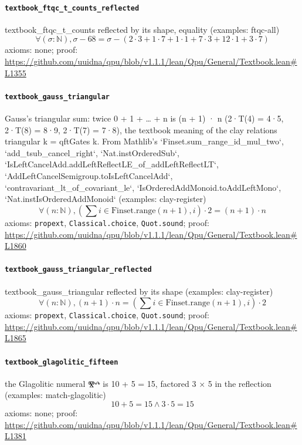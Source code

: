 \documentclass[11pt]{article}
\begin{document}
\paragraph{\texttt{textbook\_ftqc\_t\_counts\_reflected}}
textbook\_ftqc\_t\_counts reflected by its shape, equality (examples: ftqc-all)
\[ \forall (\sigma : \mathbb{N}), \sigma - 68 = \sigma - (2 \cdot 3 + 1 \cdot 7 + 1 \cdot 1 + 7 \cdot 3 + 12 \cdot 1 + 3 \cdot 7) \]
\noindent axioms: none; proof: \url{https://github.com/uuidna/qpu/blob/v1.1.1/lean/Qpu/General/Textbook.lean\#L1355}

\paragraph{\texttt{textbook\_gauss\_triangular}}
Gauss's triangular sum: twice 0 + 1 + … + n is (n + 1) · n (2·T(4) = 4·5, 2·T(8) = 8·9, 2·T(7) = 7·8), the textbook meaning of the clay relations triangular k = qftGates k. From Mathlib's `Finset.sum\_range\_id\_mul\_two`, `add\_tsub\_cancel\_right`, `Nat.instOrderedSub`, `IsLeftCancelAdd.addLeftReflectLE\_of\_addLeftReflectLT`, `AddLeftCancelSemigroup.toIsLeftCancelAdd`, `contravariant\_lt\_of\_covariant\_le`, `IsOrderedAddMonoid.toAddLeftMono`, `Nat.instIsOrderedAddMonoid` (examples: clay-register)
\[ \forall (n : \mathbb{N}), (\sum i \in \mathrm{Finset.range} (n + 1), i) \cdot 2 = (n + 1) \cdot n \]
\noindent axioms: \texttt{propext}, \texttt{Classical.choice}, \texttt{Quot.sound}; proof: \url{https://github.com/uuidna/qpu/blob/v1.1.1/lean/Qpu/General/Textbook.lean\#L1860}

\paragraph{\texttt{textbook\_gauss\_triangular\_reflected}}
textbook\_gauss\_triangular reflected by its shape (examples: clay-register)
\[ \forall (n : \mathbb{N}), (n + 1) \cdot n = (\sum i \in \mathrm{Finset.range} (n + 1), i) \cdot 2 \]
\noindent axioms: \texttt{propext}, \texttt{Classical.choice}, \texttt{Quot.sound}; proof: \url{https://github.com/uuidna/qpu/blob/v1.1.1/lean/Qpu/General/Textbook.lean\#L1865}

\paragraph{\texttt{textbook\_glagolitic\_fifteen}}
the Glagolitic numeral Ⰺⰴ is 10 + 5 = 15, factored 3 × 5 in the reflection (examples: match-glagolitic)
\[ 10 + 5 = 15 \land 3 \cdot 5 = 15 \]
\noindent axioms: none; proof: \url{https://github.com/uuidna/qpu/blob/v1.1.1/lean/Qpu/General/Textbook.lean\#L1381}
\end{document}
